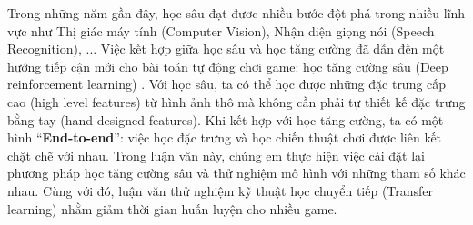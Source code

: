 Trong những năm gần đây, học sâu đạt đươc nhiều bước đột phá trong nhiều lĩnh vực như Thị giác máy tính (Computer Vision), Nhận diện giọng nói (Speech Recognition), ...  
Việc kết hợp giữa học sâu và học tăng cường đã dẫn đến một hướng tiếp cận mới cho bài toán tự động chơi game: học tăng cường sâu (Deep reinforcement learning) \cite{mnihdqn2015}. 
Với học sâu, ta có thể học được những đặc trưng cấp cao (high level features) từ hình ảnh thô mà không cần phải tự thiết kế đặc trưng bằng tay (hand-designed features). 
Khi kết hợp với học tăng cường, ta có một hình ``\textbf{End-to-end}'': việc học đặc trưng và học chiến thuật chơi được liên kết chặt chẽ với nhau. 
Trong luận văn này, chúng em thực hiện việc cài đặt lại phương pháp học tăng cường sâu và thử nghiệm mô hình với những tham số khác nhau. 
Cùng với đó, luận văn thử nghiệm kỹ thuật học chuyển tiếp (Transfer learning) nhằm giảm thời gian huấn luyện cho nhiều game.